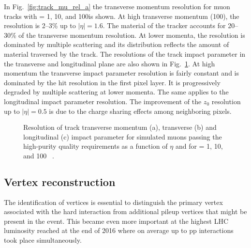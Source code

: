 In Fig.~\ref{fig:track_mu_rel_a} the transverse momentum resolution for muon tracks with \pt = 1, 10, and 100\GeV is shown. At high transverse momentum (100\GeV), the resolution is 2--3\% up to $|\eta| = 1.6$.
The material of the tracker accounts for 20--30\% of the transverse momentum resolution.
At lower momenta, the resolution is dominated by multiple scattering and its distribution reflects the amount of material traversed by the track.
The resolutions of the track impact parameter in the transverse and longitudinal plane are also shown in Fig.~\ref{fig:track_mu_rel}. At high momentum the transverse impact parameter resolution is fairly constant and is dominated by the hit resolution in the first pixel layer. It is progressively degraded by multiple scattering at lower momenta. The same applies to the longitudinal impact parameter resolution. The improvement of the $z_0$ resolution up to $|\eta| = 0.5$ is due to the charge sharing effects among neighboring pixels.

\begin{figure}[!htb]
\centering
{}
\caption{Resolution of track transverse momentum (a), transverse (b) and longitudinal (c) impact parameter for simulated muons passing the high-purity quality requirements as a function of $\eta$ and for \pt = 1, 10, and 100 \GeV~\cite{Chatrchyan:2014fea}.}
\label{fig:track_mu_rel}
\end{figure}

\subsection{Vertex reconstruction}

The identification of vertices is essential to distinguish the primary vertex associated with the hard interaction from additional pileup vertices that might be present in the event. This became even more important at the highest LHC luminosity reached at the end of 2016 where on average up to  pp interactions took place simultaneously.\\

